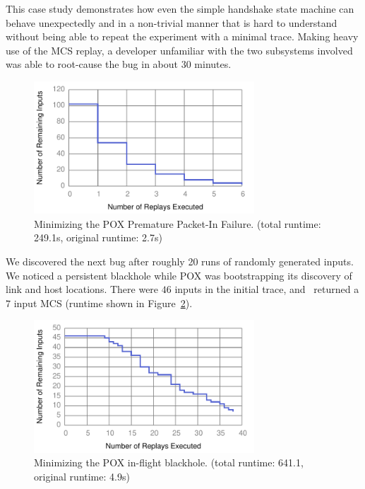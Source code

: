 This case study demonstrates
how even the simple handshake state machine can behave unexpectedly and in a
non-trivial manner that is hard to understand without being able to repeat the
experiment with a minimal trace. Making heavy use of the MCS replay, a developer
unfamiliar with the two subsystems involved was able to root-cause the bug in
about 30 minutes.
\begin{figure}[t]
    \includegraphics[width=3.25in]{../graphs/runtime/pox_early_packetin.pdf}
    \caption[]{\label{fig:pox_handshake} Minimizing the POX Premature
    Packet-In Failure. (total runtime: 249.1s, original runtime: 2.7s)}
\end{figure}
 We
discovered the next bug after roughly 20 runs of randomly generated inputs.
We noticed a persistent blackhole while POX was bootstrapping its
discovery of link and host locations. There were $46$ inputs in the initial
trace, and \projectname~returned a $7$ input
MCS (runtime shown in Figure~\ref{fig:pox_discovery}).

\begin{figure}[t]
    \includegraphics[width=3.25in]{../graphs/runtime/pox_blackhole.pdf}
    \caption[]{\label{fig:pox_discovery} Minimizing the POX in-flight
    blackhole. (total runtime: 641.1, original runtime: 4.9s)}
\end{figure}

